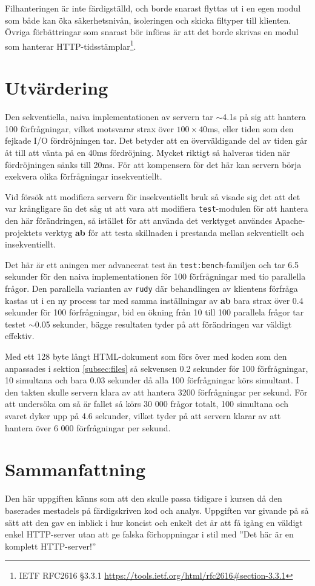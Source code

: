 \documentclass[a4paper, 11pt]{article}
\begin{document}
Filhanteringen är inte färdigställd, och borde snarast flyttas ut i en egen modul som både kan öka säkerhetsnivån, isoleringen och skicka filtyper till klienten. Övriga förbättringar som snarast bör införas är att det borde skrivas en modul som hanterar HTTP-tidsstämplar\footnote{IETF RFC2616 §3.3.1 \url{https://tools.ietf.org/html/rfc2616\#section-3.3.1}}.

\section{Utvärdering}
\label{sec:utv}
Den sekventiella, naiva implementationen av servern tar $\sim$4.1s på sig att hantera 100 förfrågningar, vilket motsvarar strax över $100\times 40$ms, eller tiden som den fejkade I/O fördröjningen tar. Det betyder att en överväldigande del av tiden går åt till att vänta på en 40ms fördröjning. Mycket riktigt så halveras tiden när fördröjningen sänks till 20ms. För att kompensera för det här kan servern börja exekvera olika förfrågningar insekventiellt.

Vid försök att modifiera servern för insekventiellt bruk så visade sig det att det var krångligare än det såg ut att vara att modifiera \texttt{test}-modulen för att hantera den här förändringen, så istället för att använda det verktyget användes Apache-projektets verktyg \textbf{ab} för att testa skillnaden i prestanda mellan sekventiellt och insekventiellt.

Det här är ett aningen mer advancerat test än \texttt{test:bench}-familjen och tar 6.5 sekunder för den naiva implementationen för 100 förfrågningar med tio parallella frågor. Den parallella varianten av \texttt{rudy} där behandlingen av klientens förfråga kastas ut i en ny process tar med samma inställningar av \textbf{ab} bara strax över 0.4 sekunder för 100 förfrågningar, bid en ökning från 10 till 100 parallela frågor tar testet $\sim$0.05 sekunder, bägge resultaten tyder på att förändringen var väldigt effektiv.

Med ett 128 byte långt HTML-dokument som förs över med koden som den anpassades i sektion \ref{subsec:files} så sekvensen 0.2 sekunder för 100 förfrågningar, 10 simultana och bara 0.03 sekunder då alla 100 förfrågningar körs simultant. I den takten skulle servern klara av att hantera 3200 förfrågningar per sekund. För att undersöka om så är fallet så körs 30 000 frågor totalt, 100 simultana och svaret dyker upp på 4.6 sekunder, vilket tyder på att servern klarar av att hantera över 6 000 förfrågningar per sekund.

\section{Sammanfattning}
Den här uppgiften känns som att den skulle passa tidigare i kursen då den baserades mestadels på färdigskriven kod och analys. Uppgiften var givande på så sätt att den gav en inblick i hur koncist och enkelt det är att få igång en väldigt enkel HTTP-server utan att ge falska förhoppningar i stil med ''Det här är en komplett HTTP-server!''
\end{document}
